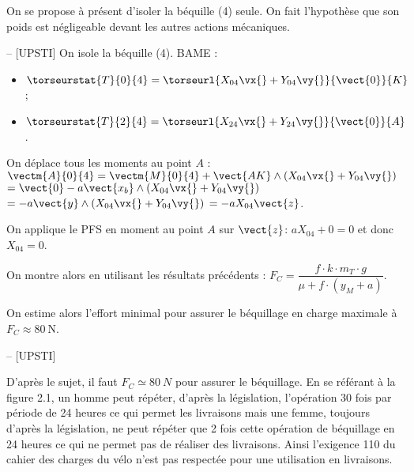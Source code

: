 On se propose à présent d'isoler la béquille (4) seule. On fait l'hypothèse que son poids est négligeable devant les autres actions mécaniques.
\ifprof
\begin{corrige}-- [UPSTI]
On isole la béquille (4).
BAME :
\begin{itemize}
\item $\torseurstat{T}{0}{4} = \torseurl{X_{04}\vx{}+Y_{04}\vy{}}{\vect{0}}{K}$;
\item $\torseurstat{T}{2}{4}= \torseurl{X_{24}\vx{}+Y_{24}\vy{}}{\vect{0}}{A}$.
\end{itemize}
 
On déplace tous les moments au point $A$ :
$\vectm{A}{0}{4}=\vectm{M}{0}{4}+\vect{AK}\wedge \left(X_{04}\vx{}+Y_{04}\vy{}\right)$
$=\vect{0}  - a \vect{x_b} \wedge \left(X_{04}\vx{}+Y_{04}\vy{}\right)$
$=- a \vect{y} \wedge \left(X_{04}\vx{}+Y_{04}\vy{}\right)$
$=-aX_{04} \vect{z}$.

On applique le PFS en moment au point 
$A$ sur 
$\vect{z}$: 
$aX_{04}+0=0$ et donc 
$X_{04}=0$.

\end{corrige}
\else
\fi

On montre alors en utilisant les résultats précédents :
$F_{C}=\dfrac{f \cdot k \cdot m_{T} \cdot g}{\mu+f \cdot\left(y_{M}+a\right)}$.

On estime alors l'effort minimal pour assurer le béquillage en charge maximale à \(F_{C} \approx 80 \mathrm{~N}\).

\ifprof
\begin{corrige}-- [UPSTI]

D’après le sujet, il faut $F_C \simeq \SI{80}{N}$ pour assurer le béquillage. En se référant à la figure 2.1, un homme peut répéter, d’après la législation, l’opération 30 fois par période de 24 heures ce qui permet les livraisons mais une femme, toujours d’après la législation, ne peut répéter que 2 fois cette opération de béquillage en 24 heures ce qui ne permet pas de réaliser des livraisons. Ainsi l’exigence 110 du cahier des charges du vélo n’est pas respectée pour une utilisation en livraisons.

\end{corrige}
\else
\fi


